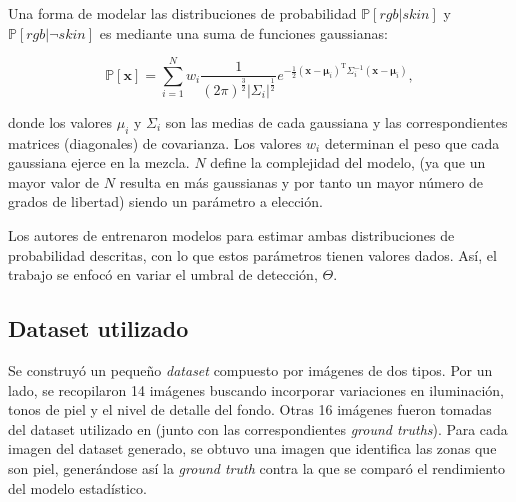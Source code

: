 \documentclass[12pt]{article}
\begin{document}
Una forma de modelar las distribuciones de probabilidad  $\mathbb{P} [ rgb|skin
]$ y $\mathbb{P} [ rgb | \neg skin ]$ es mediante una suma de funciones
gaussianas:

\begin{equation}
    \mathbb{P}[\mathbf{x}] = \sum\limits_{i=1}^N w_i
    \frac{1}{(2\pi)^{\frac{3}{2}} | \Sigma_i |^\frac{1}{2}} e^{-\frac{1}{2}
    (\mathbf{x} - \mathbf{\mu}_i)^{\text{T}} \Sigma_i ^{-1} (\mathbf{x} -
    \mathbf{\mu}_i)},
\end{equation} 

donde los valores $\mu_i$ y $\Sigma_i$ son las medias de cada gaussiana y las
correspondientes matrices (diagonales) de covarianza. Los valores $w_i$
determinan el peso que cada gaussiana ejerce en la mezcla. $N$ define la
complejidad del modelo, (ya que un mayor valor de $N$ resulta en más gaussianas
y por tanto un mayor número de grados de libertad) siendo un parámetro a
elección. 

Los autores de \cite{skin} entrenaron modelos para estimar ambas
distribuciones de probabilidad descritas, con lo que estos parámetros tienen
valores dados. Así, el trabajo se enfocó en variar el umbral de detección,
$\Theta$.

\subsection{Dataset utilizado}

Se construyó un pequeño \emph{dataset} compuesto por imágenes de dos tipos. Por
un lado, se recopilaron 14 imágenes buscando incorporar variaciones en
iluminación, tonos de piel y el nivel de detalle del fondo. Otras 16 imágenes
fueron tomadas del dataset utilizado en \cite{dataset} (junto con las
correspondientes \emph{ground truths}). Para cada imagen del
dataset generado, se obtuvo una imagen que identifica las zonas que son piel,
generándose así la \emph{ground truth} contra la que se comparó el rendimiento
del modelo estadístico.
\end{document}
